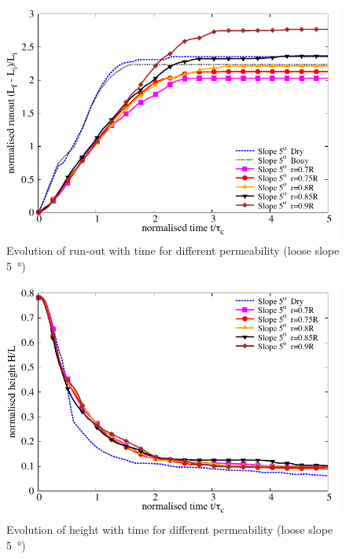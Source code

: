 \begin{figure}
\centering
\includegraphics[width=0.97\columnwidth]{Runout_loose_5_slope}
\caption{Evolution of run-out with time for different permeability (loose slope \SI{5}{\degree})}
\label{fig:run5}
\end{figure}


\begin{figure}
\centering
\includegraphics[width=0.97\columnwidth]{Height_loose_5_slope}
\caption{Evolution of height with time for different permeability (loose slope \SI{5}{\degree})}
\label{fig:height5}
\end{figure}

